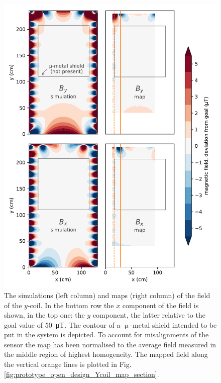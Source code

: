 
\begin{figure}
  \centering
  \includegraphics[width=\linewidth]{gfx/prototype/open_planar_map_comparison.pdf}
  \caption{The simulations (left column) and maps (right column) of the field of the $y$-coil. In the bottom row the $x$ component of the field is shown, in the top one: the $y$ component, the latter relative to the goal value of \SI{50}{\micro\tesla}. The contour of a $\upmu$-metal shield intended to be put in the system is depicted. To account for misalignments of the sensor the map has been normalised to the average field measured in the middle region of highest homogeneity. The mapped field along the vertical orange lines is plotted in Fig.\,\ref{fig:prototype_open_design_Ycoil_map_section}.}\label{fig:prototype_open_design_Ycoil_maps}
\end{figure}

